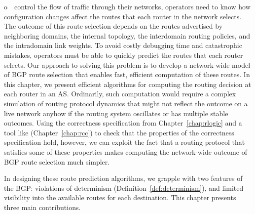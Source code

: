 
\label{sec:sandbox_intro}
o~~control the flow of traffic through their networks, operators need
to know how configuration changes affect the routes that each router in
the network selects.  The outcome of this route selection depends on the
routes advertised by neighboring domains, the internal topology, the
interdomain routing policies, and the intradomain link weights.  To
avoid costly debugging time and catastrophic mistakes, operators must be
able to quickly predict the routes that each router selects.  Our
approach to solving this problem is to develop a network-wide model of BGP
route selection that enables fast, efficient computation of these
routes. In this chapter, we present efficient algorithms for computing
the routing decision at each router in an AS.  Ordinarily, such
computation would require a complex simulation of routing protocol
dynamics that might not reflect the outcome on a live network anyhow if
the routing system oscillates or has multiple stable outcomes.  Using
the correctness specification from Chapter~\ref{chap:rlogic} and a tool
like \rcc (Chapter~\ref{chap:rcc}) to check that the properties of the
correctness specification hold, however, we can exploit the fact that a
routing protocol that satisfies some of these properties makes computing
the network-wide outcome of BGP route selection much simpler.

In designing these route prediction algorithms, we grapple with two
features of the BGP: violations of determinism
(Definition~\ref{def:determinism}), and limited visibility into the
available routes for each destination.
%
This chapter presents three main contributions.

